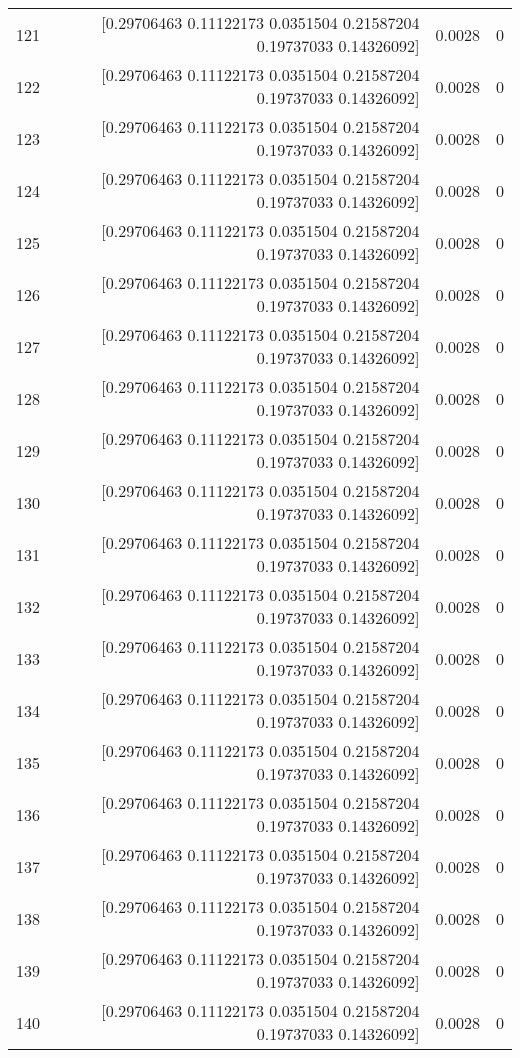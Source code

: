 \begin{longtable}{lrrr}
121 & [0.29706463 0.11122173 0.0351504  0.21587204 0.19737033 0.14326092] & 0.0028 & 0 \\
122 & [0.29706463 0.11122173 0.0351504  0.21587204 0.19737033 0.14326092] & 0.0028 & 0 \\
123 & [0.29706463 0.11122173 0.0351504  0.21587204 0.19737033 0.14326092] & 0.0028 & 0 \\
124 & [0.29706463 0.11122173 0.0351504  0.21587204 0.19737033 0.14326092] & 0.0028 & 0 \\
125 & [0.29706463 0.11122173 0.0351504  0.21587204 0.19737033 0.14326092] & 0.0028 & 0 \\
126 & [0.29706463 0.11122173 0.0351504  0.21587204 0.19737033 0.14326092] & 0.0028 & 0 \\
127 & [0.29706463 0.11122173 0.0351504  0.21587204 0.19737033 0.14326092] & 0.0028 & 0 \\
128 & [0.29706463 0.11122173 0.0351504  0.21587204 0.19737033 0.14326092] & 0.0028 & 0 \\
129 & [0.29706463 0.11122173 0.0351504  0.21587204 0.19737033 0.14326092] & 0.0028 & 0 \\
130 & [0.29706463 0.11122173 0.0351504  0.21587204 0.19737033 0.14326092] & 0.0028 & 0 \\
131 & [0.29706463 0.11122173 0.0351504  0.21587204 0.19737033 0.14326092] & 0.0028 & 0 \\
132 & [0.29706463 0.11122173 0.0351504  0.21587204 0.19737033 0.14326092] & 0.0028 & 0 \\
133 & [0.29706463 0.11122173 0.0351504  0.21587204 0.19737033 0.14326092] & 0.0028 & 0 \\
134 & [0.29706463 0.11122173 0.0351504  0.21587204 0.19737033 0.14326092] & 0.0028 & 0 \\
135 & [0.29706463 0.11122173 0.0351504  0.21587204 0.19737033 0.14326092] & 0.0028 & 0 \\
136 & [0.29706463 0.11122173 0.0351504  0.21587204 0.19737033 0.14326092] & 0.0028 & 0 \\
137 & [0.29706463 0.11122173 0.0351504  0.21587204 0.19737033 0.14326092] & 0.0028 & 0 \\
138 & [0.29706463 0.11122173 0.0351504  0.21587204 0.19737033 0.14326092] & 0.0028 & 0 \\
139 & [0.29706463 0.11122173 0.0351504  0.21587204 0.19737033 0.14326092] & 0.0028 & 0 \\
140 & [0.29706463 0.11122173 0.0351504  0.21587204 0.19737033 0.14326092] & 0.0028 & 0 \\

\end{longtable}
